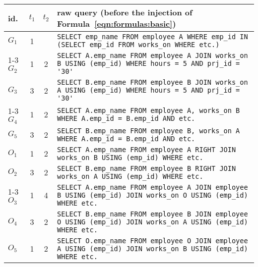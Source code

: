 
    \small\sffamily
    \begin{tabular}{l|cc|l}
    id. & $t_1$ & $t_2$ & raw query (before the injection of Formula~\ref{eqn:formulas:basic}) \\
    \hline
    $G_{1}$ & 1 &  & \lstinline[basicstyle=\scriptsize\ttfamily,keepspaces=true]|SELECT emp_name FROM employee A WHERE emp_id IN (SELECT emp_id FROM works_on WHERE etc.)| \\
\cline{1-3}
$G_{2}$ & 1 & 2 & \lstinline[basicstyle=\scriptsize\ttfamily,keepspaces=true]|SELECT A.emp_name FROM employee A JOIN works_on B USING (emp_id) WHERE hours = 5 AND prj_id = '30'| \\
$G_{3}$ & 3 & 2 & \lstinline[basicstyle=\scriptsize\ttfamily,keepspaces=true]|SELECT B.emp_name FROM employee B JOIN works_on A USING (emp_id) WHERE hours = 5 AND prj_id = '30'| \\
\cline{1-3}
$G_{4}$ & 1 & 2 & \lstinline[basicstyle=\scriptsize\ttfamily,keepspaces=true]|SELECT A.emp_name FROM employee A, works_on B WHERE A.emp_id = B.emp_id AND etc.| \\
$G_{5}$ & 3 & 2 & \lstinline[basicstyle=\scriptsize\ttfamily,keepspaces=true]|SELECT B.emp_name FROM employee B, works_on A WHERE A.emp_id = B.emp_id AND etc.| \\
\hline
$O_{1}$ & \textcolor{ACMOrange}{1} & \textcolor{ACMOrange}{2} & \lstinline[basicstyle=\scriptsize\ttfamily,keepspaces=true]|SELECT A.emp_name FROM employee A RIGHT JOIN works_on B USING (emp_id) WHERE etc.| \\
$O_{2}$ & \textcolor{ACMOrange}{3} & \textcolor{ACMOrange}{2} & \lstinline[basicstyle=\scriptsize\ttfamily,keepspaces=true]|SELECT B.emp_name FROM employee B RIGHT JOIN works_on A USING (emp_id) WHERE etc.| \\
\cline{1-3}
$O_{3}$ & \textcolor{ACMOrange}{1} & 4 & \lstinline[basicstyle=\scriptsize\ttfamily,keepspaces=true]|SELECT A.emp_name FROM employee A JOIN employee B USING (emp_id) JOIN works_on O USING (emp_id) WHERE etc.| \\
$O_{4}$ & \textcolor{ACMOrange}{3} & \textcolor{ACMOrange}{2} & \lstinline[basicstyle=\scriptsize\ttfamily,keepspaces=true]|SELECT B.emp_name FROM employee B JOIN employee O USING (emp_id) JOIN works_on A USING (emp_id) WHERE etc.| \\
$O_{5}$ & \textcolor{ACMOrange}{1} & \textcolor{ACMOrange}{2} & \lstinline[basicstyle=\scriptsize\ttfamily,keepspaces=true]|SELECT O.emp_name FROM employee O JOIN employee A USING (emp_id) JOIN works_on B USING (emp_id) WHERE etc.| \\

\end{tabular}

